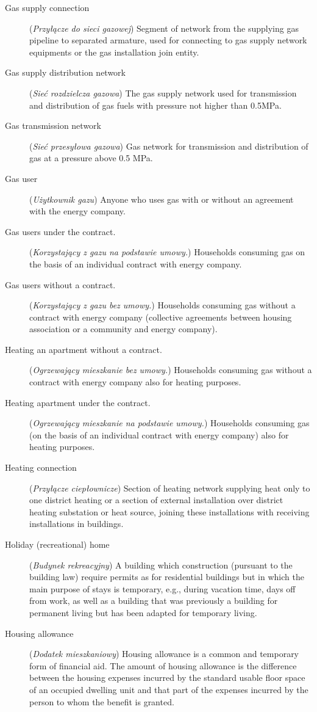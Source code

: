 \documentclass[12pt,a4paper]{article}
\begin{document}
\begin{description}
\item[Gas supply connection] (\textit{Przyłącze do sieci gazowej}) Segment of network from the supplying gas pipeline to separated armature, used for connecting to gas supply network equipments or the gas installation join entity.
\item[Gas supply distribution network] (\textit{Sieć rozdzielcza gazowa}) The gas supply network used for transmission and distribution of gas fuels with pressure not higher than 0.5MPa.
\item[Gas transmission network] (\textit{Sieć przesyłowa gazowa}) Gas network for transmission and distribution of gas at a pressure above 0.5 MPa.
\item[Gas user] (\textit{Użytkownik gazu}) Anyone who uses gas with or without an agreement with the energy company.
\item[Gas users under the contract.] (\textit{Korzystający z gazu na podstawie umowy.}) Households consuming gas on the basis of an individual contract with energy company.
\item[Gas users without a contract.] (\textit{Korzystający z gazu bez umowy.}) Households consuming gas without a contract with energy company (collective agreements between housing association or a community and energy company).
\item[Heating an apartment without a contract.] (\textit{Ogrzewający mieszkanie bez umowy.}) Households consuming gas without a contract with energy company also for heating purposes.
\item[Heating apartment under the contract.] (\textit{Ogrzewający mieszkanie na podstawie umowy.}) Households consuming gas (on the basis of an individual contract with energy company) also for heating purposes.
\item[Heating connection] (\textit{Przyłącze ciepłownicze}) Section of heating network supplying heat only to one district heating or a section of external installation over district heating substation or heat source, joining these installations with receiving installations in buildings.
\item[Holiday (recreational) home] (\textit{Budynek rekreacyjny}) A building which construction (pursuant to the building law) require permits as for residential buildings but in which the main purpose of stays is temporary, e.g., during vacation time, days off from work, as well as a building that was previously a building for permanent living but has been adapted for temporary living.
\item[Housing allowance] (\textit{Dodatek mieszkaniowy}) Housing allowance is a common and temporary form of financial aid. The amount of housing allowance is the difference between the housing expenses incurred by the standard usable floor space of an occupied dwelling unit and that part of the expenses incurred by the person to whom the benefit is granted.

\end{description}
\end{document}
